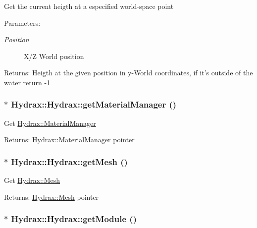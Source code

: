 Get the current heigth at a especified world-space point \begin{Desc}
\item[Parameters:]
\begin{description}
\item[{\em Position}]X/Z World position \end{description}
\end{Desc}
\begin{Desc}
\item[Returns:]Heigth at the given position in y-World coordinates, if it's outside of the water return -1 \end{Desc}
\hypertarget{class_hydrax_1_1_hydrax_572279649449549c7be3ef809221fbae}{
\subsubsection[{getMaterialManager}]{$\ast$ Hydrax::Hydrax::getMaterialManager ()}}
\label{class_hydrax_1_1_hydrax_572279649449549c7be3ef809221fbae}


Get \hyperlink{class_hydrax_1_1_material_manager}{Hydrax::MaterialManager} \begin{Desc}
\item[Returns:]\hyperlink{class_hydrax_1_1_material_manager}{Hydrax::MaterialManager} pointer \end{Desc}
\hypertarget{class_hydrax_1_1_hydrax_1940a144c486915885ed19026839d381}{
\subsubsection[{getMesh}]{$\ast$ Hydrax::Hydrax::getMesh ()}}
\label{class_hydrax_1_1_hydrax_1940a144c486915885ed19026839d381}


Get \hyperlink{class_hydrax_1_1_mesh}{Hydrax::Mesh} \begin{Desc}
\item[Returns:]\hyperlink{class_hydrax_1_1_mesh}{Hydrax::Mesh} pointer \end{Desc}
\hypertarget{class_hydrax_1_1_hydrax_9ebb3dbda04c58af5affc4156277d681}{
\subsubsection[{getModule}]{$\ast$ Hydrax::Hydrax::getModule ()}}
\label{class_hydrax_1_1_hydrax_9ebb3dbda04c58af5affc4156277d681}


